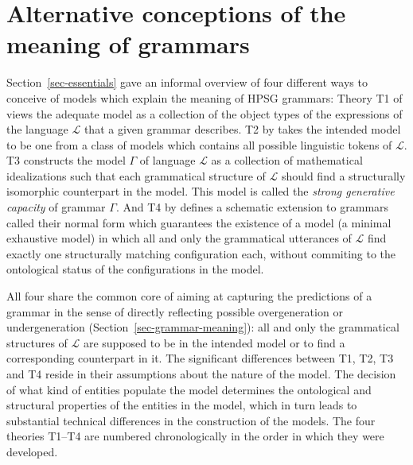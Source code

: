 \documentclass[output=paper
 	        ,biblatex
                ,babelshorthands
                ,newtxmath
                ,draftmode
                ,colorlinks, citecolor=brown
]{langscibook}
\begin{document}
{\section{Alternative conceptions of the meaning of grammars}
\label{sec-alt-gr-meaning}

Section~\ref{sec-essentials} gave an informal overview of four
different ways to conceive of models which explain the meaning of HPSG
grammars: Theory T1 of \cite{PollardSag1994} views the adequate model
as a collection of the object types of the expressions of the language
$\mathcal{L}$ that a given grammar describes. T2 by \citet{King99a-u}
takes the intended model to be one from a class of models which contains
all possible linguistic tokens of $\mathcal{L}$.  T3
\citep{Pollard99a} constructs the model $\Gamma$ of language $\mathcal{L}$ as a
collection of mathematical idealizations such that each grammatical
structure of $\mathcal{L}$ should find a structurally isomorphic
counterpart in the model. This model is called the \emph{strong generative
capacity} of grammar $\Gamma$. And T4 by \citet{Richter2007a} defines a
schematic extension to grammars called their normal form which
guarantees the existence of a model (a minimal exhaustive model) in
which all and only the grammatical utterances of $\mathcal{L}$ find
exactly one structurally matching configuration each, without
commiting to the ontological status of the configurations in the
model.

All four share the common core of aiming at capturing the predictions
of a grammar in the sense of directly reflecting possible
overgeneration or undergeneration (Section~\ref{sec-grammar-meaning}):
all and only the grammatical structures of $\mathcal{L}$ are supposed
to be in the intended model or to find a corresponding counterpart in
it. The significant differences between T1, T2, T3 and T4 reside in
their assumptions about the nature of the model. The decision of what
kind of entities populate the model determines the ontological and
structural properties of the entities in the model, which in turn leads
to substantial technical differences in the construction of the
models.
The four theories T1--T4 are numbered chronologically in the order in
which they were developed.


}
\end{document}
